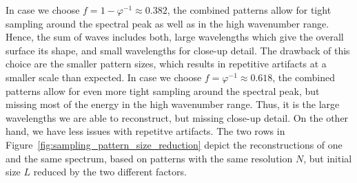 In case we choose $f = 1-\varphi^{-1} \approx 0.382$, the combined patterns
allow for tight sampling around the spectral peak as well as in the high
wavenumber range. Hence, the sum of waves includes both, large wavelengths which
give the overall surface its shape, and small wavelengths for close-up detail.
The drawback of this choice are the smaller pattern sizes, which results in
repetitive artifacts at a smaller scale than expected. In case we choose
$f = \varphi^{-1} \approx 0.618$, the combined patterns allow for even more
tight sampling around the spectral peak, but missing most of the energy in the
high wavenumber range. Thus, it is the large wavelengths we are able to
reconstruct, but missing close-up detail. On the other hand, we have less issues
with repetitve artifacts. The two rows in Figure~\ref{fig:sampling_pattern_size_reduction}
depict the reconstructions of one and the same spectrum, based on patterns with
the same resolution $N$, but initial size $L$ reduced by the two different
factors.

